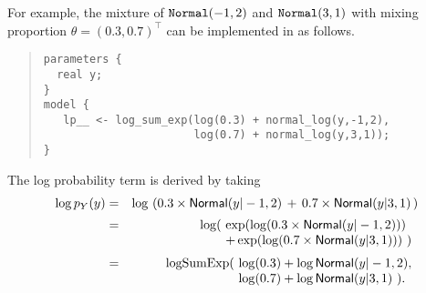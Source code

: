 For example, the mixture of ${\tt Normal}(-1,2)$ and
${\tt Normal}(3,1)$ with mixing proportion $\theta =
(0.3,0.7)^{\top}$ can be implemented in \Stan as follows.
%
\begin{quote}
\begin{Verbatim}
parameters {
  real y;
}
model {
   lp__ <- log_sum_exp(log(0.3) + normal_log(y,-1,2),
                       log(0.7) + normal_log(y,3,1));
}
\end{Verbatim}
\end{quote}
%
The log probability term is derived by taking
\begin{eqnarray*}
\log p_Y(y) & = & \log \, \left( 0.3 \times \mbox{\sf Normal}(y|-1,2) \, + \,
  0.7 \times
  \mbox{\sf Normal}(y|3,1) \, \right)
\\[2pt]
& = & \log(\! \begin{array}[t]{l}
                 \exp(\log(0.3 \times \mbox{\sf Normal}(y|-1,2))) \\
                 + \exp(\log(0.7 \times \mbox{\sf Normal}(y|3,1))) \ )
              \end{array}
\\[2pt]
& = & \mbox{logSumExp}(\! \begin{array}[t]{l}
                         \log(0.3) + \log \mbox{\sf Normal}(y|-1,2),
                         \\                  
                         \log(0.7) + \log \mbox{\sf Normal}(y|3,1) \ ).
                       \end{array}
\end{eqnarray*}

